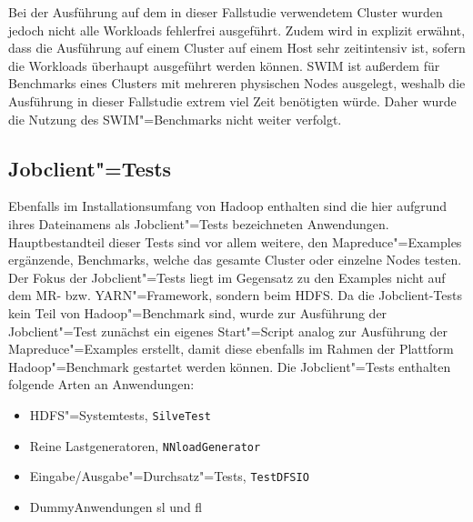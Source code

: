 Bei der Ausführung auf dem in dieser Fallstudie verwendetem Cluster wurden jedoch nicht alle Workloads fehlerfrei ausgeführt.
Zudem wird in \cite{InriaTutorial} explizit erwähnt, dass die Ausführung auf einem Cluster auf einem Host sehr zeitintensiv ist, sofern die Workloads überhaupt ausgeführt werden können.
\gls{SWIM} ist außerdem für Benchmarks eines Clusters mit mehreren physischen Nodes ausgelegt, weshalb die Ausführung in dieser Fallstudie extrem viel Zeit benötigten würde.
Daher wurde die Nutzung des \gls{SWIM}"=Benchmarks nicht weiter verfolgt.

\subsection{Jobclient"=Tests}
\label{subsec:jobclient}

Ebenfalls im Installationsumfang von Hadoop enthalten sind die hier aufgrund ihres Dateinamens als Jobclient"=Tests bezeichneten Anwendungen.
Hauptbestandteil dieser \glspl{Test} sind vor allem weitere, den Mapreduce"=Examples ergänzende, Benchmarks, welche das gesamte Cluster oder einzelne Nodes testen.
Der Fokus der Jobclient"=Tests liegt im Gegensatz zu den Examples nicht auf dem \gls{MR}- bzw. \gls{YARN}"=Framework, sondern beim \gls{HDFS}.
Da die Jobclient-Tests kein Teil von Hadoop"=Benchmark sind, wurde zur Ausführung der Jobclient"=Test zunächst ein eigenes Start"=Script analog zur Ausführung der Mapreduce"=Examples erstellt, damit diese ebenfalls im Rahmen der Plattform Hadoop"=Benchmark gestartet werden können.
Die Jobclient"=Tests enthalten \uA folgende Arten an Anwendungen:

\begin{itemize}
    \item \gls{HDFS}"=Systemtests, \zB \texttt{SilveTest}
    \item Reine Lastgeneratoren, \zB \texttt{NNloadGenerator}
    \item Eingabe/Ausgabe"=Durchsatz"=Tests, \zB \texttt{TestDFSIO}
    \item Dummy\gls{Anwendung}en \acrlong{sl} und \acrlong{fl}
\end{itemize}
